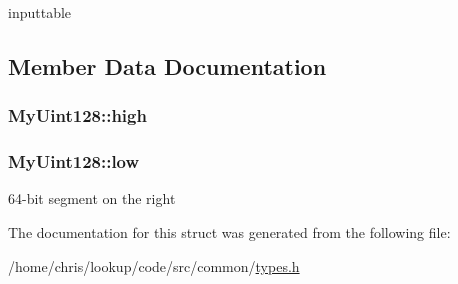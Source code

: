 inputtable 



\subsection{Member Data Documentation}
\hypertarget{structMyUint128_a6888141e5c5e44242a144e37230a55e4}{
\subsubsection[{high}]{ My\-Uint128\-::high\hspace{0.3cm}{\ttfamily [private]}}}\label{structMyUint128_a6888141e5c5e44242a144e37230a55e4}
\hypertarget{structMyUint128_a294d997f622685c41ad42040ff9ea1cf}{
\subsubsection[{low}]{ My\-Uint128\-::low\hspace{0.3cm}{\ttfamily [private]}}}\label{structMyUint128_a294d997f622685c41ad42040ff9ea1cf}


64-\/bit segment on the right 



The documentation for this struct was generated from the following file\-:\begin{DoxyCompactItemize}
\item 
/home/chris/lookup/code/src/common/\hyperlink{types_8h}{types.\-h}\end{DoxyCompactItemize}

